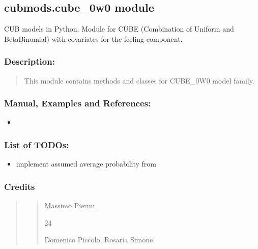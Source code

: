 \documentclass[letterpaper,10pt,english]{sphinxmanual}
\begin{document}
\subsection{cubmods.cube\_0w0 module}
\label{\detokenize{cubmods:module-cubmods.cube_0w0}}\label{\detokenize{cubmods:cubmods-cube-0w0-module}}\label{\detokenize{cubmods:cube0w0-module}}
\sphinxAtStartPar
CUB models in Python.
Module for CUBE (Combination of Uniform
and Beta\sphinxhyphen{}Binomial) with covariates for the feeling component.


\subsubsection{Description:}
\label{\detokenize{cubmods:id21}}\begin{quote}

\sphinxAtStartPar
This module contains methods and classes
for CUBE\_0W0 model family.
\end{quote}


\subsubsection{Manual, Examples and References:}
\label{\detokenize{cubmods:id22}}\begin{itemize}
\item {} 
\sphinxAtStartPar
{}

\end{itemize}


\subsubsection{List of TODOs:}
\label{\detokenize{cubmods:id23}}\begin{itemize}
\item {} 
\sphinxAtStartPar
implement assumed average probability from 

\end{itemize}


\subsubsection{Credits}
\label{\detokenize{cubmods:id24}}\begin{quote}
\begin{quote}\begin{description}
\sphinxAtStartPar
Massimo Pierini

\sphinxhyphen{}24

\sphinxAtStartPar
Domenico Piccolo, Rosaria Simone

\sphinxAtStartPar
{}

\end{description}\end{quote}
\end{quote}
\end{document}
